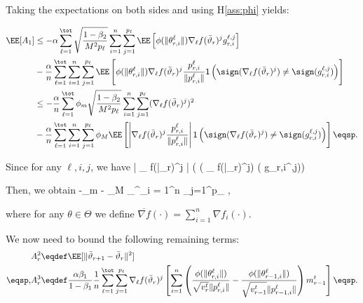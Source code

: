 \documentclass{article}
\begin{document}
Taking the expectations on both sides and using H\ref{ass:phi} yields:

\begin{align}\notag
\EE[A_1]  & \leq - \alpha \sum_{\ell=1}^\tot  \sqrt{\frac{1-\beta_2}{M^2 p_\ell}} \sum_{i = 1}^n \sum_{j=1}^{p_\ell} \EE \left[  \phi(\|\theta_{r,i}^{\ell}\|)  \nabla_{\ell} f(\bar{\vartheta}_r)^j  g^{\ell, j}_{r,i}\right]\\\notag
& - \frac{\alpha}{n} \sum_{\ell=1}^\tot \sum_{i = 1}^n \sum_{j=1}^{p_\ell}   \EE\left[ \phi(\|\theta_{r,i}^{\ell}\|)  \nabla_{\ell} f(\bar{\vartheta}_r)^j  \frac{p_{r,i}^{\ell}}{ \|p_{r,i}^{\ell}\|}\mathsf{1} \left( \sign(  \nabla_{\ell} f(\bar{\vartheta}_r)^j) \neq  \sign( g_{r,i}^{\ell,j}) \right) \right]\\\notag
& \leq - \frac{\alpha}{n} \sum_{\ell=1}^\tot  \phi_m \sqrt{\frac{1-\beta_2}{M^2 p_\ell}} \sum_{i = 1}^n \sum_{j=1}^{p_\ell}    (\nabla_{\ell} f(\bar{\vartheta}_r)^j)^2\\\notag
& - \frac{\alpha}{n} \sum_{\ell=1}^\tot \sum_{i = 1}^n \sum_{j=1}^{p_\ell} \phi_M  \EE\left[ \left| \nabla_{\ell} f(\bar{\vartheta}_r)^j  \frac{p_{r,i}^{\ell}}{ \|p_{r,i}^{\ell}\|}\right| \mathsf{1}\left( \sign(  \nabla_{\ell} f(\bar{\vartheta}_r)^j) \neq  \sign( g_{r,i}^{\ell,j})\right) \right] \eqsp.
\end{align}

Since for any $\ell, i , j$, we have
\beq\notag
  \EE{} \leq   \left| \nabla_{\ell} f(\bar{\vartheta}_r)^j \right| \left( \sign(  \nabla_{\ell} f(\bar{\vartheta}_r)^j) \neq  \sign( g_{r,i}^{\ell,j})\right) 
\eeq

Then, we obtain
\beq\label{eq:finala1}
\EE[A_1]  \leq -\alpha \phi_m     -  \alpha \phi_M \sum_{}^\tot \sum_{i = 1}^n \sum_{j=1}^{p_\ell}  \eqsp,
\eeq

where  for any $\theta \in \Theta$ we define $\overline{\nabla f}( \cdot) = \sum_{i=1}^n \nabla f_i(\cdot)$.

We now need to bound the following remaining terms:
\begin{align}\notag
& A_r^2 \eqdef \EE[  \| \bar{\vartheta}_{r+1} - \bar{\vartheta}_r \|^2]\\\notag\eqsp,
& A_r^3 \eqdef  \frac{\alpha \beta_1}{1-\beta_1}  \frac{1}{n} \sum_{\ell=1}^\tot \sum_{j=1}^{p_\ell} \nabla_{\ell} f(\bar{\vartheta}_r)^j \left[   \sum_{i = 1}^n  \left( \frac{\phi(\|\theta_{r,i}^{\ell}\|)}{\sqrt{v^{t}_{r}} \|p_{r,i}^{\ell}\|} - \frac{\phi(\|\theta_{r-1,i}^{\ell}\|)}{\sqrt{v^{t}_{r-1}} \|p_{r-1,i}^{\ell}\|} \right) m^{t}_{r-1}  \right] \eqsp.
\end{align}
\end{document}
